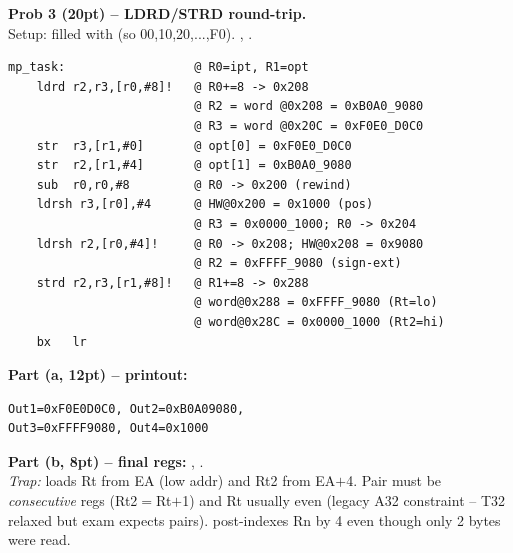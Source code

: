 \begin{qp}\textbf{Prob 3 (20pt) -- LDRD/STRD round-trip.}\\
Setup:  filled with  (so 00,10,20,...,F0). , .
\begin{lstlisting}
mp_task:                  @ R0=ipt, R1=opt
    ldrd r2,r3,[r0,#8]!   @ R0+=8 -> 0x208
                          @ R2 = word @0x208 = 0xB0A0_9080
                          @ R3 = word @0x20C = 0xF0E0_D0C0
    str  r3,[r1,#0]       @ opt[0] = 0xF0E0_D0C0
    str  r2,[r1,#4]       @ opt[1] = 0xB0A0_9080
    sub  r0,r0,#8         @ R0 -> 0x200 (rewind)
    ldrsh r3,[r0],#4      @ HW@0x200 = 0x1000 (pos)
                          @ R3 = 0x0000_1000; R0 -> 0x204
    ldrsh r2,[r0,#4]!     @ R0 -> 0x208; HW@0x208 = 0x9080
                          @ R2 = 0xFFFF_9080 (sign-ext)
    strd r2,r3,[r1,#8]!   @ R1+=8 -> 0x288
                          @ word@0x288 = 0xFFFF_9080 (Rt=lo)
                          @ word@0x28C = 0x0000_1000 (Rt2=hi)
    bx   lr
\end{lstlisting}
\textbf{Part (a, 12pt) -- printout:}
\begin{lstlisting}
Out1=0xF0E0D0C0, Out2=0xB0A09080,
Out3=0xFFFF9080, Out4=0x1000
\end{lstlisting}
\textbf{Part (b, 8pt) -- final regs:} , .\\
\emph{Trap:}  loads Rt from EA (low addr) and Rt2 from EA$+$4. Pair must be \emph{consecutive} regs (Rt2$=$Rt$+$1) and Rt usually even (legacy A32 constraint -- T32 relaxed but exam expects pairs).  post-indexes Rn by 4 even though only 2 bytes were read.
\end{qp}

